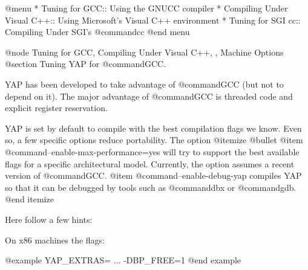@menu
* Tuning for GCC:: Using the GNUCC compiler
* Compiling Under Visual C++:: Using Microsoft's Visual C++ environment
* Tuning for SGI cc:: Compiling Under SGI's @command{cc}
@end menu


@node Tuning for GCC, Compiling Under Visual C++, , Machine Options
@section Tuning YAP for @command{GCC}.

YAP has been developed to take advantage of @command{GCC} (but not to
depend on it). The major advantage of @command{GCC} is threaded code and
explicit register reservation.

YAP is set by default to compile with the best compilation flags we
know. Even so, a few specific options reduce portability.  The option 
@itemize @bullet
 @item @command{--enable-max-performance=yes} will try to support the best
available flags for a specific architectural model. Currently, the option
assumes a recent version of @command{GCC}.
 @item @command{--enable-debug-yap} compiles YAP so that it can be debugged
by tools such as @command{dbx} or @command{gdb}.
@end itemize

Here follow a few hints:

On x86 machines the flags:

@example
YAP_EXTRAS= ... -DBP_FREE=1
@end example

